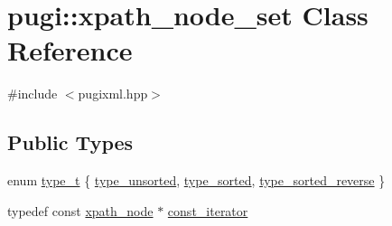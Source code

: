 \hypertarget{classpugi_1_1xpath__node__set}{\section{pugi\-:\-:xpath\-\_\-node\-\_\-set Class Reference}
\label{classpugi_1_1xpath__node__set}
}


{\ttfamily \#include $<$pugixml.\-hpp$>$}

\subsection*{Public Types}
\begin{DoxyCompactItemize}
\item 
enum \hyperlink{classpugi_1_1xpath__node__set_a6c6899c8ecfbce9e42ec85540907080e}{type\-\_\-t} \{ \hyperlink{classpugi_1_1xpath__node__set_a6c6899c8ecfbce9e42ec85540907080ea7636fa164710ab9b069850ea3b3e4924}{type\-\_\-unsorted}, 
\hyperlink{classpugi_1_1xpath__node__set_a6c6899c8ecfbce9e42ec85540907080ea9d5ce5e6194ac2003da0d86d9af87437}{type\-\_\-sorted}, 
\hyperlink{classpugi_1_1xpath__node__set_a6c6899c8ecfbce9e42ec85540907080ea7035df3be16759292de59850d6c0b9be}{type\-\_\-sorted\-\_\-reverse}
 \}
\item 
typedef const \hyperlink{classpugi_1_1xpath__node}{xpath\-\_\-node} $\ast$ \hyperlink{classpugi_1_1xpath__node__set_a6987510e88cea4a396d186285c174de6}{const\-\_\-iterator}
\end{DoxyCompactItemize}
